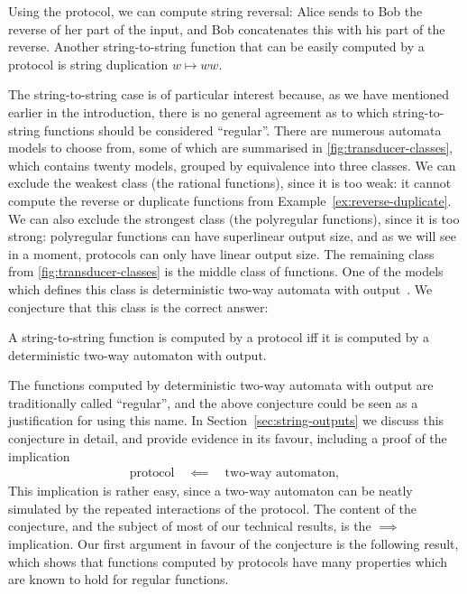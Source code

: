 \begin{myexample}\label{ex:reverse-duplicate}
    Using the protocol, we can compute string reversal: Alice sends to Bob the reverse of her part of the input, and  Bob concatenates this with  his part of the reverse. Another string-to-string function that can be easily computed by a protocol is string duplication $w \mapsto ww$. 
\end{myexample}

The string-to-string case is of particular interest because, as we have mentioned earlier in the introduction, there is no general agreement as to  which string-to-string functions should be considered ``regular''. There are numerous automata models to choose from, some of which are summarised in \cref{fig:transducer-classes}, which contains twenty models, grouped by equivalence into three classes. We can exclude the weakest class (the rational functions), since it is too weak: it  cannot compute the reverse or duplicate functions from Example~\ref{ex:reverse-duplicate}. We can also exclude the strongest class (the polyregular functions), since it is too strong: polyregular functions can have superlinear output size, and as we will see in a moment, protocols can only have linear output size. The remaining class from \cref{fig:transducer-classes} is the middle class of functions. One of the models which defines this class is  deterministic two-way automata with output~\cite{shepherdson1959reduction}. We conjecture  that this class     is the correct answer: 

\begin{conjecture}\label{conj:protocol-regular-string-to-string}
    A string-to-string function is computed by a protocol iff it is computed by a deterministic two-way automaton with output.
\end{conjecture}

The functions computed by deterministic two-way automata with output are traditionally called ``regular'', and the above conjecture could be seen as a justification for using this name.
In Section~\ref{sec:string-outputs} we discuss this conjecture in detail, and provide evidence in its favour, including a proof of the  implication 
\begin{align*}
\text{protocol} \quad \impliedby \quad \text{two-way automaton},
\end{align*} 
This implication is rather easy, since a two-way automaton can be neatly simulated by the repeated interactions of the protocol. The content of the conjecture, and the subject of most of our technical results, is the $\implies$ implication. 
Our first argument in favour of  the conjecture is the following result, which shows that functions computed  by protocols have many properties which are known to hold for regular functions.

